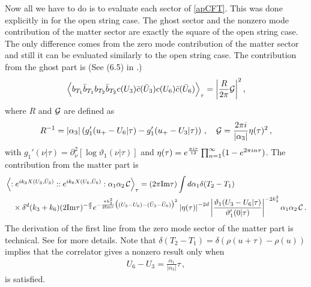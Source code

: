 \documentclass[12pt]{article}
\begin{document}
Now all we have to do is to evaluate each sector of \eqref{apCFT}.
This was done explicitly in \cite{AKT3} for the open string case.
The ghost sector and the nonzero mode contribution of the matter
sector are exactly the square of the open string case.
The only difference comes from the zero mode contribution of the
matter sector and still it can be evaluated similarly to the open
string case.
The contribution from the ghost part is (See (6.5) in \cite{AKT3}.)
\begin{align}
\Big\langle b_{T_1}\bar{b}_{T_1}b_{T_2}\bar{b}_{T_2}
c(U_3)\bar{c}(\bar{U}_3)c(U_6)\bar{c}(\bar{U}_6)\Big\rangle_\tau
=\left|{R\over 2\pi}{\cal G}\right|^2,
\end{align}
where $R$ and ${\cal G}$ are defined as
\begin{align}
R^{-1}
=|\alpha_3|\left(g_1'(u_+-U_6|\tau)-g_1'(u_+-U_3|\tau)\right)\,,
\quad{\cal G}={2\pi i\over|\alpha_3|}\eta(\tau)^2\,,
\end{align}
with $g_1'(\nu|\tau)=\partial_{\nu}^2[\log\vartheta_1(\nu|\tau)]$ and
$\eta(\tau)=e^{\pi i\tau\over 12}
\prod_{n=1}^{\infty}(1-e^{2\pi in\tau})$.
The contribution from the matter part is
\begin{align}
&\left\langle :e^{ik_3X(U_3,\bar{U}_3)}:
:e^{ik_6X(U_6,\bar{U}_6)}:\alpha_1\alpha_2\,{\cal C}\right\rangle_\tau
=(2\pi {\rm Im}\tau)\int d\alpha_1
\delta(T_2-T_1)\nonumber\\
&\quad\times\delta^d(k_3+k_6)(2{\rm Im}\tau)^{-{d\over 2}}
e^{-{\pi k_3^2\over 2{\rm Im}\tau}
\bigl((U_3-U_6)-(\bar{U}_3-\bar{U}_6)\bigr)^2}
\left|\eta(\tau)\right|^{-2d}
\left|{\vartheta}_1(U_3-U_6|\tau)
\over\vartheta'_1(0|\tau)\right|^{-2k_3^2}\alpha_1\alpha_2\,{\cal C}\,.
\end{align}
The derivation of the first line from the zero mode sector of the
matter part is technical.
See \cite{AKT3} for more details.
Note that $\delta(T_2-T_1)=\delta(\rho(u+\tau)-\rho(u))$ implies 
that the correlator gives a nonzero result only when
\begin{align}
U_6-U_3=\frac{\alpha_1}{|\alpha_3|}\tau\,,
\end{align}
is satisfied.
\end{document}
